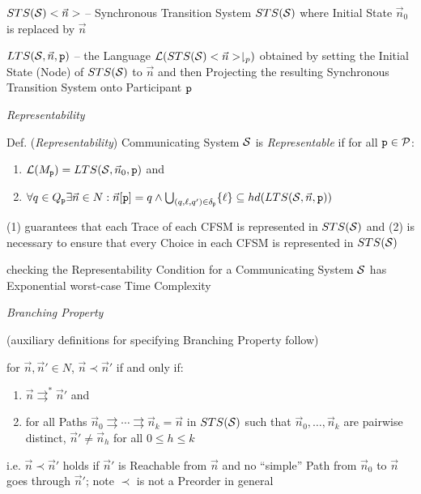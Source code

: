 $STS(\mathcal{S})<\vec{n}>$ -- Synchronous Transition System
$STS(\mathcal{S})$ where Initial State $\vec{n}_0$ is replaced by
$\vec{n}$

$LTS(\mathcal{S},\vec{n},\mathtt{p})$ -- the Language
$\mathcal{L}(STS(\mathcal{S})<\vec{n}>\downharpoonright_p)$ obtained by
setting the Initial State (Node) of $STS(\mathcal{S})$ to $\vec{n}$ and
then Projecting the resulting Synchronous Transition System onto
Participant $\mathtt{p}$


\emph{Representability}

Def. (\emph{Representability}) Communicating System $\mathcal{S}$ is
\emph{Representable} if for all $\mathtt{p} \in \mathcal{P}$:
\begin{enumerate}
  \item $\mathcal{L}(M_\mathtt{p}) = LTS(\mathcal{S},\vec{n}_0,\mathtt{p})$ and
  \item $\forall q \in Q_\mathtt{p} \exists \vec{n} \in N :
    \vec{n}[\mathtt{p}] = q \wedge
      \bigcup_{(q,\ell,q')\in\delta_\mathtt{p}} \{ \ell \}
        \subseteq hd(LTS(\mathcal{S},\vec{n},\mathtt{p}))$
\end{enumerate}
(1) guarantees that each Trace of each CFSM is represented in
$STS(\mathcal{S})$ and (2) is necessary to ensure that every Choice in
each CFSM is represented in $STS(\mathcal{S})$

checking the Representability Condition for a Communicating System
$\mathcal{S}$ has Exponential worst-case Time Complexity


\emph{Branching Property}

(auxiliary definitions for specifying Branching Property follow)

for $\vec{n},\vec{n}' \in N$, $\vec{n} \prec \vec{n}'$ if and only if:
\begin{enumerate}
  \item $\vec{n}\rightrightarrows^*\vec{n}'$ and
  \item for all Paths
    $\vec{n}_0\rightrightarrows\cdots\rightrightarrows\vec{n}_k =
    \vec{n}$ in $STS(\mathcal{S})$ such that
    $\vec{n}_0,\ldots,\vec{n}_k$ are pairwise distinct,
    $\vec{n}'\neq\vec{n}_h$ for all $0 \leq h \leq k$
\end{enumerate}
i.e. $\vec{n} \prec \vec{n}'$ holds if $\vec{n}'$ is Reachable from
$\vec{n}$ and no ``simple'' Path from $\vec{n}_0$ to $\vec{n}$ goes
through $\vec{n}'$; note $\prec$ is not a Preorder in general

